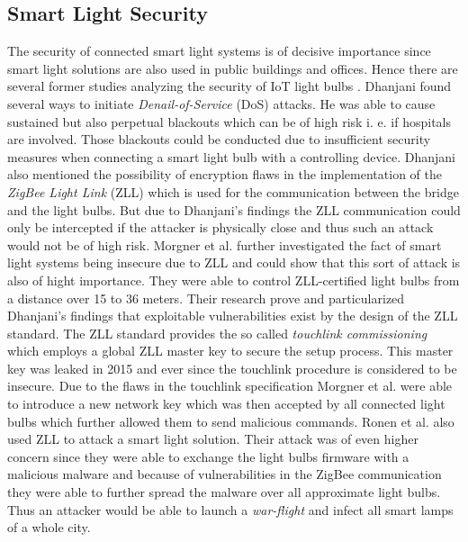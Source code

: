 \documentclass[11pt,a4paper]{article}
\begin{document}
	\subsection{Smart Light Security}%
	\label{sub:smart_light_security}
	The security of connected smart light systems is of decisive importance since smart light solutions are also used in public buildings and offices. Hence there are several former studies analyzing the security of IoT light bulbs \cite{Dhanjani:2013:HLSEPHPWLS, Morgner:2016:AYBBUICSSCLS, Ronen:2018:IGNCZCR}. 
	Dhanjani \cite{Dhanjani:2013:HLSEPHPWLS} found several ways to initiate \textit{Denail-of-Service} (DoS) attacks. He was able to cause sustained but also perpetual blackouts which can be of high risk i. e. if hospitals are involved. Those blackouts could be conducted due to insufficient security measures when connecting a smart light bulb with a controlling device. Dhanjani also mentioned the possibility of encryption flaws in the implementation of the \textit{ZigBee Light Link} (ZLL) which is used for the communication between the bridge and the light bulbs. But due to Dhanjani's findings the ZLL communication could only be intercepted if the attacker is physically close and thus such an attack would not be of high risk.
	Morgner et al. \cite{Morgner:2016:AYBBUICSSCLS} further investigated the fact of smart light systems being insecure due to ZLL and could show that this sort of attack is also of hight importance. They were able to control ZLL-certified light bulbs from a distance over 15 to 36 meters. Their research prove and particularized Dhanjani's \cite{Dhanjani:2013:HLSEPHPWLS} findings that exploitable vulnerabilities exist by the design of the ZLL standard. The ZLL standard provides the so called \textit{touchlink commissioning} which employs a global ZLL master key to secure the setup process. This master key was leaked in 2015 \cite{Morgner:2016:AYBBUICSSCLS} and ever since the touchlink procedure is considered to be insecure. Due to the flaws in the touchlink specification Morgner et al. were able to introduce a new network key which was then accepted by all connected light bulbs which further allowed them to send malicious commands. 
	Ronen et al. \cite{Ronen:2018:IGNCZCR} also used ZLL to attack a smart light solution. Their attack was of even higher concern since they were able to exchange the light bulbs firmware with a malicious malware and because of vulnerabilities in the ZigBee communication they were able to further spread the malware over all approximate light bulbs. Thus an attacker would be able to launch a \textit{war-flight} and infect all smart lamps of a whole city.
\end{document}
